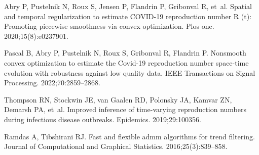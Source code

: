 \documentclass[10pt,letterpaper]{article}
\begin{document}
\begin{thebibliography}{10}
  Abry P, Pustelnik N, Roux S, Jensen P, Flandrin P, Gribonval R, et~al.
  \newblock Spatial and temporal regularization to estimate COVID-19 reproduction
    number R (t): Promoting piecewise smoothness via convex optimization.
  \newblock Plos one. 2020;15(8):e0237901.
  
  Pascal B, Abry P, Pustelnik N, Roux S, Gribonval R, Flandrin P.
  \newblock Nonsmooth convex optimization to estimate the Covid-19 reproduction
    number space-time evolution with robustness against low quality data.
  \newblock IEEE Transactions on Signal Processing. 2022;70:2859--2868.
  
  Thompson RN, Stockwin JE, van Gaalen RD, Polonsky JA, Kamvar ZN, Demarsh PA,
    et~al.
  \newblock Improved inference of time-varying reproduction numbers during
    infectious disease outbreaks.
  \newblock Epidemics. 2019;29:100356.
  
  Ramdas A, Tibshirani RJ.
  \newblock Fast and flexible admm algorithms for trend filtering.
  \newblock Journal of Computational and Graphical Statistics.
    2016;25(3):839--858.
  
\end{thebibliography}
  

%
\end{document}
